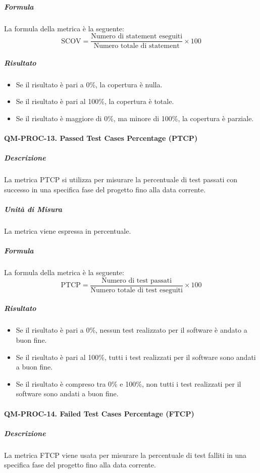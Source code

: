 			\subparagraph{Formula}
			La formula della metrica è la seguente:
			\[
				\text{SCOV} = \frac{\text{Numero di statement eseguiti}}{\text{Numero totale di statement}} \times 100
			\]

			\subparagraph{Risultato}
			\begin{itemize}
				\item Se il risultato è pari a 0\%, la copertura è nulla.
				\item Se il risultato è pari al 100\%, la copertura è totale.
				\item Se il risultato è maggiore di 0\%, ma minore di 100\%, la copertura è parziale.
			\end{itemize}

		\paragraph{QM-PROC-13. Passed Test Cases Percentage (PTCP)}

			\subparagraph{Descrizione}
			La metrica PTCP si utilizza per misurare la percentuale di test passati con successo in una specifica fase del progetto fino alla data corrente.

			\subparagraph{Unità di Misura}
			La metrica viene espressa in percentuale.

			\subparagraph{Formula}
			La formula della metrica è la seguente:
			\[
				\text{PTCP} = \frac{\text{Numero di test passati}}{\text{Numero totale di test eseguiti}} \times 100
			\]

			\subparagraph{Risultato}
			\begin{itemize}
				\item Se il risultato è pari a 0\%, nessun test realizzato per il software è andato a buon fine.
				\item Se il risultato è pari al 100\%, tutti i test realizzati per il software sono andati a buon fine.
				\item Se il risultato è compreso tra 0\% e 100\%, non tutti i test realizzati per il software sono andati a buon fine.
			\end{itemize}

		\paragraph{QM-PROC-14. Failed Test Cases Percentage (FTCP)}

			\subparagraph{Descrizione}
			La metrica FTCP viene usata per misurare la percentuale di test falliti in una specifica fase del progetto fino alla data corrente.

